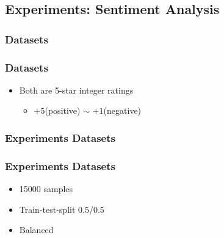 \documentclass[mathserif]{beamer}
\begin{document}
\subsection{Experiments: Sentiment Analysis}
\subsubsection{Datasets}
\begin{frame}
\frametitle{Datasets}
	\begin{itemize}
	\item Both are 5-star integer ratings
		\begin{itemize}
		\item $+5$(positive) $\sim$ $+1$(negative)
		\end{itemize}
	\end{itemize}
\vspace{-4ex}

\end{frame}

\subsubsection{Experiments Datasets}
\begin{frame}
\frametitle{Experiments Datasets}
	\begin{itemize}
	\item 15000 samples
	\item Train-test-split 0.5/0.5
	\item Balanced
	\end{itemize}

\end{frame}
\end{document}
